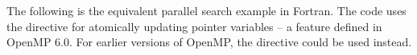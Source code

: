 

The following is the equivalent parallel search example in Fortran.
The code uses the  directive for atomically
updating pointer variables -- a feature defined in OpenMP 6.0.
For earlier versions of OpenMP, the  directive could 
be used instead.



